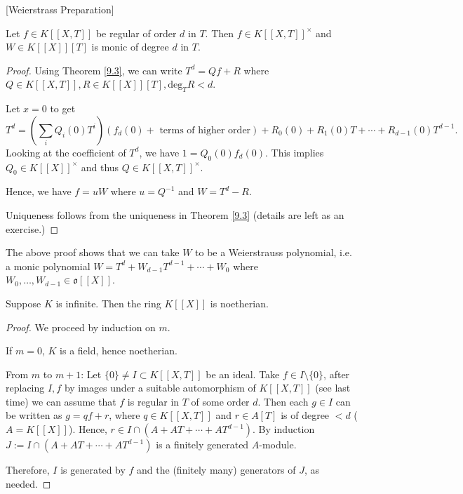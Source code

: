 
\begin{corollary}\label{9.4}[Weierstrass Preparation] %

Let $f\in K[[X,T]]$ be regular of order $d$ in $T$.
Then $f\in K[[X,T]]^\times$ and $W\in K[[X]][T]$ is monic of degree $d$ in $T$.
 \end{corollary}

\begin{proof} %

Using Theorem \eqref{9.3}, we can write $T^d = Qf+R$ where $Q\in K[[X,T]], R\in K[[X]][T], \mathrm{deg}_TR < d$.

Let $x=0$ to get
$$T^d = \left( \sum_i Q_i(0) T^i \right) (f_d(0) + \textrm{ terms of higher order} )
+ R_0(0) + R_1(0) T + \cdots + R_{d-1}(0) T^{d-1}.$$
Looking at the coefficient of $T^d$, we have $1 = Q_0(0) f_d(0)$.
This implies $Q_0 \in K[[X]]^\times$ and thus $Q\in K[[X,T]]^\times$.

Hence, we have $f = uW$ where $u = Q^{-1}$ and $W = T^d - R$.

Uniqueness follows from the uniqueness in Theorem \eqref{9.3} (details are left as an exercise.)
 \end{proof}

\begin{remark}
The above proof shows that we can take $W$ to be a Weierstrauss polynomial, i.e. a monic polynomial
$W = T^d + W_{d-1} T^{d-1} + \cdots + W_0$ where $W_0,\ldots, W_{d-1}\in \mathfrak{o}[[X]]$.
\end{remark}

\begin{corollary} %
Suppose $K$ is infinite. Then the ring $K[[X]]$ is noetherian.
 \end{corollary}

\begin{proof} %
We proceed by induction on $m$.

If $m=0$, $K$ is a field, hence noetherian.

From $m$ to $m+1$:
Let $\{0\} \neq I \subset K[[X,T]]$ be an ideal.
Take $f\in I\setminus \{0\}$, after replacing $I,f$ by images under a suitable automorphism of $K[[X,T]]$
(see last time) we can assume that $f$ is regular in $T$ of some order $d$.
Then each $g\in I$ can be written as $g = qf + r$, where $q\in K[[X,T]]$ and $r\in A[T]$ is of degree $<d$ ($A = K[[X]]$).
Hence, $r\in I \cap (A + AT + \cdots + AT^{d-1})$. By induction $J:= I\cap (A + AT + \cdots + AT^{d-1})$ is a finitely generated $A$-module.

Therefore, $I$ is generated by $f$ and the (finitely many) generators of $J$, as needed.
 \end{proof}

